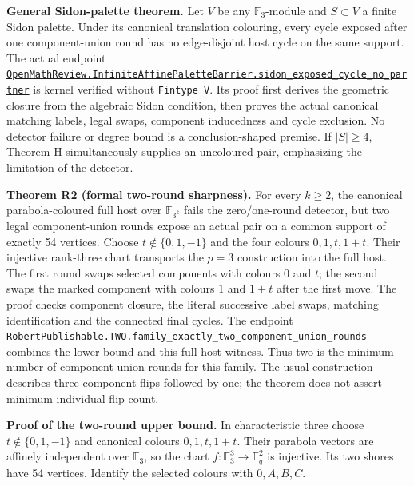 \documentclass[smallextended]{svjour3}
\begin{document}
\textbf{General Sidon-palette theorem.} Let \(V\) be any
\(\mathbb F_3\)-module and \(S\subset V\) a finite Sidon palette. Under
its canonical translation colouring, every cycle exposed after one
component-union round has no edge-disjoint host cycle on the same
support. The actual endpoint
\href{https://github.com/alejandrozu/openmath-2026-judging/blob/70c5ec3107658182f22c207d4c50f53f9cb3e602/robert-review-2026-10-07/lean/InfiniteAffinePaletteBarrier.lean\#L54}{{\ttfamily\nolinkurl{OpenMathReview.InfiniteAffinePaletteBarrier.sidon_exposed_cycle_no_partner}}}
is kernel verified without \texttt{Fintype\ V}. Its proof first derives
the geometric closure from the algebraic Sidon condition, then proves
the actual canonical matching labels, legal swaps, component inducedness
and cycle exclusion. No detector failure or degree bound is a
conclusion-shaped premise. If \(|S|\geq4\), Theorem H simultaneously
supplies an uncoloured pair, emphasizing the limitation of the detector.

\textbf{Theorem R2 (formal two-round sharpness).} For every \(k\geq2\),
the canonical parabola-coloured full host over \(\mathbb F_{3^k}\) fails
the zero/one-round detector, but two legal component-union rounds expose
an actual pair on a common support of exactly 54 vertices. Choose
\(t\notin\{0,1,-1\}\) and the four colours \(0,1,t,1+t\). Their
injective rank-three chart transports the \(p=3\) construction into the
full host. The first round swaps selected components with colours \(0\)
and \(t\); the second swaps the marked component with colours \(1\) and
\(1+t\) after the first move. The proof checks component closure, the
literal successive label swaps, matching identification and the
connected final cycles. The endpoint
\href{https://github.com/alejandrozu/openmath-2026-judging/blob/70c5ec3107658182f22c207d4c50f53f9cb3e602/robert-review-2026-10-07/lean/CycleComposition.lean\#L171}{{\ttfamily\nolinkurl{RobertPublishable.TWO.family_exactly_two_component_union_rounds}}}
combines the lower bound and this full-host witness. Thus two is the
minimum number of component-union rounds for this family. The usual
construction describes three component flips followed by one; the
theorem does not assert minimum individual-flip count.

\textbf{Proof of the two-round upper bound.} In characteristic three
choose \(t\notin\{0,1,-1\}\) and canonical colours \(0,1,t,1+t\). Their
parabola vectors are affinely independent over \(\mathbb F_3\), so the
chart \(f:\mathbb F_3^3\to\mathbb F_q^2\) is injective. Its two shores
have 54 vertices. Identify the selected colours with \(0,A,B,C\).
\end{document}
